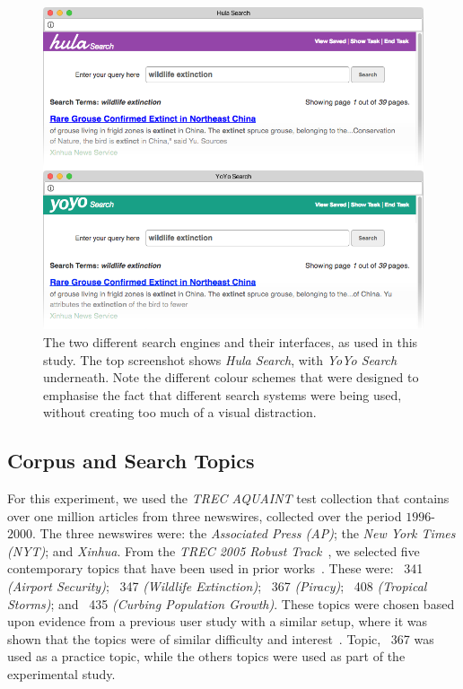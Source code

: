 \begin{figure}[t!]
\includegraphics[width=1.0\columnwidth]{figures/interface-both.png}
\caption{The two different search engines and their interfaces, as used in this study. The top screenshot shows \emph{Hula Search}, with \emph{YoYo Search} underneath. Note the different colour schemes that were designed to emphasise the fact that different search systems were being used, without creating too much of a visual distraction.
} 
\label{fig_systems}
\end{figure}

\subsection{Corpus and Search Topics}\label{sec:method:corpus}
For this experiment, we used the \emph{TREC AQUAINT} test collection that contains over one million articles from three newswires, collected over the period $1996$-$2000$. The three newswires were: the \emph{Associated Press (AP)}; the \emph{New York Times (NYT)}; and \emph{Xinhua}.  From the \emph{TREC 2005 Robust Track}~\cite{voorhees2006trec_robust}, we selected five contemporary topics that have been used in prior works~\cite{kelly2009query_suggestion,azzopardi2013query_cost,maxwell2017snippet_length}. These were: ~341 \emph{(Airport Security)}; ~347 \emph{(Wildlife Extinction)}; ~367 \emph{(Piracy)}; ~408 \emph{(Tropical Storms)}; and ~435 \emph{(Curbing Population Growth)}. These topics were chosen based upon evidence from a previous user study with a similar setup, where it was shown that the topics were of similar difficulty and interest~\cite{kelly2009query_suggestion}. Topic, ~367 was used as a practice topic, while the others topics were used as part of the experimental study.

